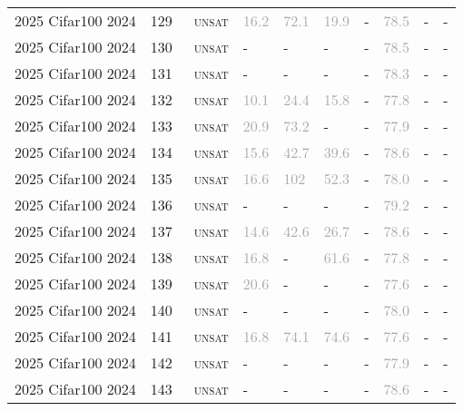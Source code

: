 \begin{center}
{\begin{longtable}{@{}llllllllll@{}}
2025 Cifar100 2024 & 129 & ~\textsc{unsat} & \textcolor{darkgray}{16.2} & \textcolor{darkgray}{72.1} & \textcolor{darkgray}{19.9} & - & \textcolor{darkgray}{78.5} & - & - \\
2025 Cifar100 2024 & 130 & ~\textsc{unsat} & - & - & - & - & \textcolor{darkgray}{78.5} & - & - \\
2025 Cifar100 2024 & 131 & ~\textsc{unsat} & - & - & - & - & \textcolor{darkgray}{78.3} & - & - \\
2025 Cifar100 2024 & 132 & ~\textsc{unsat} & \textcolor{darkgray}{10.1} & \textcolor{darkgray}{24.4} & \textcolor{darkgray}{15.8} & - & \textcolor{darkgray}{77.8} & - & - \\
2025 Cifar100 2024 & 133 & ~\textsc{unsat} & \textcolor{darkgray}{20.9} & \textcolor{darkgray}{73.2} & - & - & \textcolor{darkgray}{77.9} & - & - \\
2025 Cifar100 2024 & 134 & ~\textsc{unsat} & \textcolor{darkgray}{15.6} & \textcolor{darkgray}{42.7} & \textcolor{darkgray}{39.6} & - & \textcolor{darkgray}{78.6} & - & - \\
2025 Cifar100 2024 & 135 & ~\textsc{unsat} & \textcolor{darkgray}{16.6} & \textcolor{darkgray}{102} & \textcolor{darkgray}{52.3} & - & \textcolor{darkgray}{78.0} & - & - \\
2025 Cifar100 2024 & 136 & ~\textsc{unsat} & - & - & - & - & \textcolor{darkgray}{79.2} & - & - \\
2025 Cifar100 2024 & 137 & ~\textsc{unsat} & \textcolor{darkgray}{14.6} & \textcolor{darkgray}{42.6} & \textcolor{darkgray}{26.7} & - & \textcolor{darkgray}{78.6} & - & - \\
2025 Cifar100 2024 & 138 & ~\textsc{unsat} & \textcolor{darkgray}{16.8} & - & \textcolor{darkgray}{61.6} & - & \textcolor{darkgray}{77.8} & - & - \\
2025 Cifar100 2024 & 139 & ~\textsc{unsat} & \textcolor{darkgray}{20.6} & - & - & - & \textcolor{darkgray}{77.6} & - & - \\
2025 Cifar100 2024 & 140 & ~\textsc{unsat} & - & - & - & - & \textcolor{darkgray}{78.0} & - & - \\
2025 Cifar100 2024 & 141 & ~\textsc{unsat} & \textcolor{darkgray}{16.8} & \textcolor{darkgray}{74.1} & \textcolor{darkgray}{74.6} & - & \textcolor{darkgray}{77.6} & - & - \\
2025 Cifar100 2024 & 142 & ~\textsc{unsat} & - & - & - & - & \textcolor{darkgray}{77.9} & - & - \\
2025 Cifar100 2024 & 143 & ~\textsc{unsat} & - & - & - & - & \textcolor{darkgray}{78.6} & - & - \\

\end{longtable}}
\end{center}
